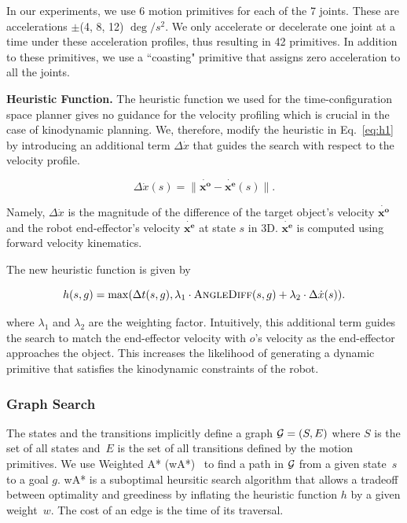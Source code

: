 \documentclass[a4paper]{report}
\begin{document}
In our experiments, we use 6 motion primitives for each of the 7 joints. These are accelerations $\pm$(4, 8, 12) $\deg/s^2$. We only accelerate or decelerate one joint at a time under these acceleration profiles, thus resulting in 42 primitives. In addition to these primitives, we use a ``coasting" primitive that assigns zero acceleration to all the joints.

\textbf{Heuristic Function.}
The heuristic function we used for the time-configuration space planner gives no guidance for the velocity profiling which is crucial in the case of kinodynamic planning. We, therefore, modify the heuristic in Eq.~\ref{eq:h1} by introducing an additional term $\Delta \dot{x}$ that guides the search with respect to the velocity profile.

\begin{equation}
\Delta \dot{x}(s) = \|\mathbf{\dot{x^o} - \dot{x^e}}(s)\|.
\end{equation}

Namely, $\Delta \dot{x}$ is the magnitude of the difference of the target object's velocity $\mathbf{\dot{x^o}}$ and the robot end-effector's velocity $\mathbf{\dot{x^e}}$ at state $s$ in 3D. $\mathbf{\dot{x^e}}$ is computed using forward velocity kinematics.

The new heuristic function is given by


$$
 h(s,g) = \max (\Delta t(s,g),
 \lambda_1 \cdot \textsc{AngleDiff}(s,g) + \lambda_2 \cdot \Delta \dot{x}(s)).
 $$


where $\lambda_1$ and $\lambda_2$ are the weighting factor. Intuitively, this additional term guides the search to match the end-effector velocity with $o$'s velocity as the end-effector approaches the object. This increases the likelihood of generating a dynamic primitive that satisfies the kinodynamic constraints of the robot. 

\subsubsection{Graph Search}
The states and the transitions implicitly define a graph $\mathcal{G} = (S,E)$ where $S$ is the set of all states and~$E$ is the set of all transitions defined by the motion primitives. We use Weighted A* (wA*)~\cite{pohl1970heuristic} to find a path in $\mathcal{G}$ from a given state~$s$ to a goal $g$. 
wA* is a suboptimal heursitic search algorithm that allows a tradeoff between optimality and greediness by inflating the heuristic function $h$ by a given weight~$w$. The cost of an edge is the time of its traversal.
\end{document}
